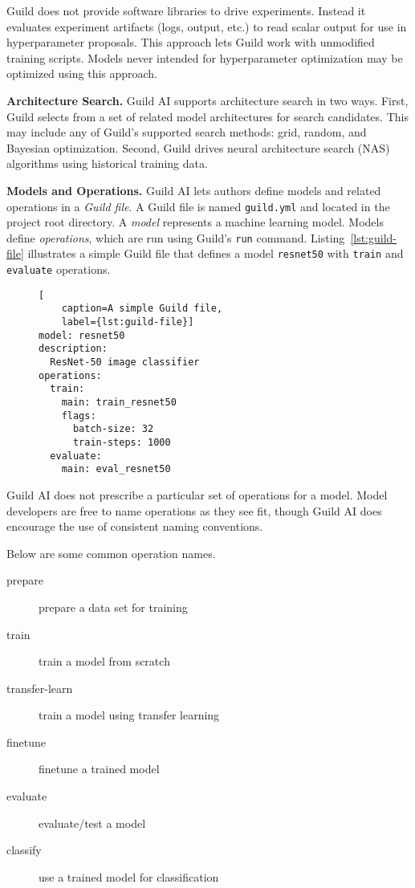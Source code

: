 \documentclass{article}
\begin{document}
Guild does not provide software libraries to drive
experiments. Instead it evaluates experiment artifacts (logs, output,
etc.) to read scalar output for use in hyperparameter proposals. This
approach lets Guild work with unmodified training scripts. Models
never intended for hyperparameter optimization may be optimized using
this approach.

\textbf{Architecture Search.} Guild AI supports architecture search in
two ways. First, Guild selects from a set of related model
architectures for search candidates. This may include any of Guild's
supported search methods: grid, random, and Bayesian
optimization. Second, Guild drives neural architecture search (NAS)
algorithms using historical training data.

\textbf{Models and Operations.} Guild AI lets authors define models
and related operations in a \emph{Guild file}. A Guild file is named
\texttt{guild.yml} and located in the project root directory. A
\emph{model} represents a machine learning model. Models define
\emph{operations}, which are run using Guild's \texttt{run}
command. Listing~\ref{lst:guild-file} illustrates a simple Guild file
that defines a model \texttt{resnet50} with \texttt{train} and
\texttt{evaluate} operations.

\begin{figure}
\begin{lstlisting}[
    caption=A simple Guild file,
    label={lst:guild-file}]
model: resnet50
description:
  ResNet-50 image classifier
operations:
  train:
    main: train_resnet50
    flags:
      batch-size: 32
      train-steps: 1000
  evaluate:
    main: eval_resnet50
\end{lstlisting}
\end{figure}

Guild AI does not prescribe a particular set of operations for a
model. Model developers are free to name operations as they see fit,
though Guild AI does encourage the use of consistent naming
conventions.

Below are some common operation names.

\begin{description}
\item[prepare] prepare a data set for training
\item[train] train a model from scratch
\item[transfer-learn] train a model using transfer learning
\item[finetune] finetune a trained model
\item[evaluate] evaluate/test a model
\item[classify] use a trained model for classification
\end{description}
\end{document}
